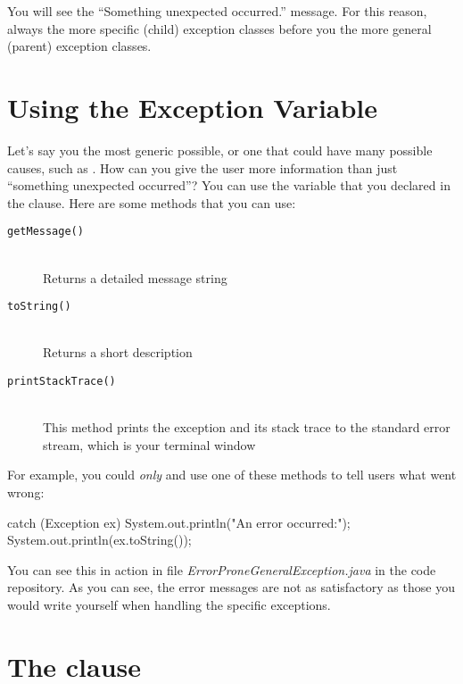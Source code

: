 You will see the ``Something unexpected occurred.'' message.  For this reason, always  the more specific (child) exception classes before you  the more general (parent) exception classes.

\section{Using the Exception Variable}

Let's say you  the most generic  possible, or one that could have many possible causes, such as . How can you give the user more information than just ``something unexpected occurred''? You can use the variable that you declared in the  clause. Here are some methods that you can use\footnotemark:


\begin{description}
  \item[{\tt getMessage()}] \hfill \\ Returns a detailed message string
  \item[{\tt toString()}] \hfill \\ Returns a short description
  \item[{\tt printStackTrace()}] \hfill \\ This  method prints the exception and its stack trace to the standard error stream, which is your terminal window
\end{description}

For example, you could  {\em only}  and use one of these methods to tell users what went wrong:

\begin{code}
catch (Exception ex) {
    System.out.println("An error occurred:");
    System.out.println(ex.toString());
}
\end{code}

You can see this in action in file {\it ErrorProneGeneralException.java} in the code repository. As you can see, the error messages are not as satisfactory as those you would write yourself when handling the specific exceptions.


\section{The  clause}

